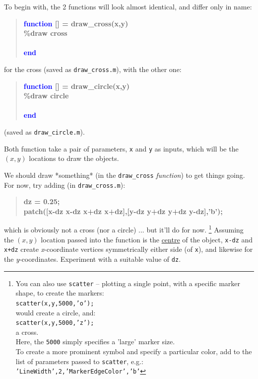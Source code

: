 \documentclass{tufte-book} %
\newenvironment{docspecbold}{\begin{quotation}\ttfamily\bfseries\parskip0pt\parindent0pt\ignorespaces}{\end{quotation}}
\begin{document}
To begin with, the 2 functions will look almost identical, and differ only in name:
\begin{docspecbold}
\textcolor{blue}{function} [] = draw\_cross(x,y)\\
\textcolor[rgb]{0,0.501961,0}{\%draw cross\\}
\ \\
\textcolor{blue}{end}
\end{docspecbold}
for the cross (saved as \texttt{draw\_cross.m}), with the other one:

\vspace{-2mm}\begin{docspecbold}
\textcolor{blue}{function} [] = draw\_circle(x,y)\\
\textcolor[rgb]{0,0.501961,0}{\%draw circle\\}
\ \\
\textcolor{blue}{end}
\end{docspecbold}\vspace{-2mm}
(saved as \texttt{draw\_circle.m}).

Both function take a pair of parameters, \texttt{x} and \texttt{y} as inputs, which will be the \((x,y)\) locations to draw the objects.

We should draw *something* (in the \texttt{draw\_cross}  \textit{function}) to get things going. For now, try adding (in \texttt{draw\_cross.m}):
\begin{docspecbold}
dz = 0.25;\\
patch([x-dz x-dz x+dz x+dz],[y-dz y+dz y+dz y-dz],'b');
\end{docspecbold}
which is obviously not a cross (nor a circle) ... but it'll do for now.
\footnote{You can also use \texttt{scatter} -- plotting a single point, with a specific marker shape, to create the markers:\\ \texttt{scatter(x,y,5000,'o');} \\would create a circle, and:\\ \texttt{scatter(x,y,5000,'z');} \\a cross. \\Here, the \texttt{5000} simply specifies a 'large' marker size.\\To create a more prominent symbol and specify a particular color, add to the list of parameters passed to \texttt{scatter}, e.g.: \\\texttt{'LineWidth',2,'MarkerEdgeColor','b'}}
Assuming the \((x,y)\) location passed into the function is the \uline{centre} of the object, \texttt{x-dz} and \texttt{x+dz} create \textit{x}-coordinate vertices symmetrically either side (of \texttt{x}), and likewise for the \textit{y}-coordinates. Experiment with a suitable value of \texttt{dz}.
\end{document}
